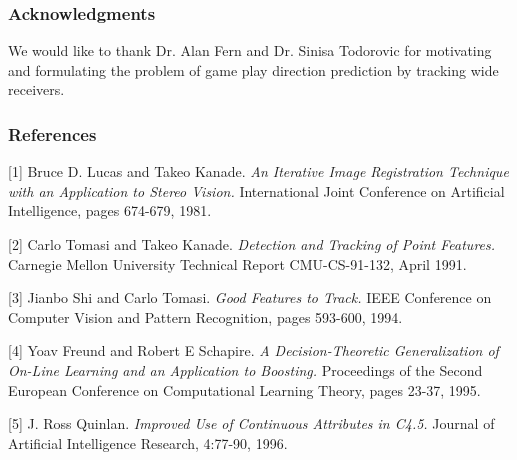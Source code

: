 \documentclass{article} %
\begin{document}
\subsubsection*{Acknowledgments}

We would like to thank Dr. Alan Fern and  Dr. Sinisa Todorovic for motivating and formulating the problem of game play direction prediction by tracking wide receivers.

\subsubsection*{References}

\small{
[1] Bruce D. Lucas and Takeo Kanade. {\it An Iterative Image Registration Technique with an Application to Stereo Vision.} International Joint Conference on Artificial Intelligence, pages 674-679, 1981.

[2] Carlo Tomasi and Takeo Kanade. {\it Detection and Tracking of Point Features.} Carnegie Mellon University Technical Report CMU-CS-91-132, April 1991.

[3] Jianbo Shi and Carlo Tomasi. {\it Good Features to Track.} IEEE Conference on Computer Vision and Pattern Recognition, pages 593-600, 1994.

[4] Yoav Freund and Robert E Schapire. {\it A Decision-Theoretic Generalization of On-Line Learning and an Application to Boosting.} Proceedings of the Second European Conference on Computational Learning Theory, pages 23-37, 1995.

[5] J. Ross Quinlan. {\it Improved Use of Continuous Attributes in C4.5.} Journal of Artificial Intelligence Research, 4:77-90, 1996.
}
\end{document}
